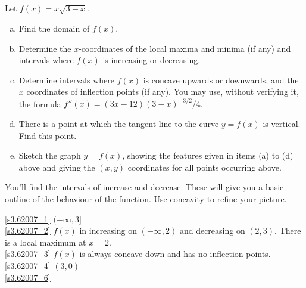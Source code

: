 %
%

\subsection*{\Procedural}

\begin{Mquestion}[2007H]
 Let $f(x) = x\sqrt{3 - x}$.
\begin{enumerate}[(a)]
\item\label{s3.62007_1} Find the domain of $f(x)$.
\item\label{s3.62007_2} Determine the $x$-coordinates of the local
maxima and minima (if any) and intervals where $f(x)$ is increasing or decreasing.
\item\label{s3.62007_3}  Determine intervals where $f(x)$ is concave
upwards or downwards, and the $x$ coordinates of inflection points (if any).
You may use, without verifying it, the formula $f''(x) = (3x -12)(3 - x)^{-3/2}/4$.
\item\label{s3.62007_4}  There is a point at which the tangent line to the
curve $y = f(x)$ is vertical. Find this point.
\item\label{s3.62007_6} Sketch the graph $y = f(x)$, showing
the features given in items (a) to (d) above and giving the $(x, y)$ coordinates
for all points occurring above.
\end{enumerate}
\end{Mquestion}
\begin{hint}
You'll find the intervals of increase and decrease. These will give you a basic outline of the behaviour of the function. Use  concavity to refine your picture.
\end{hint}
\begin{answer}
\eqref{s3.62007_1} $(-\infty,3]$
\\
\eqref{s3.62007_2} $f(x)$ in increasing on $(-\infty,2)$ and decreasing on $(2,3)$. There is a local maximum at $x=2$.
\\
\eqref{s3.62007_3} $f(x)$ is always concave down and has no inflection points.
\\
\eqref{s3.62007_4} $(3,0)$
\\
\eqref{s3.62007_6}
\begin{center}
\end{center}

\end{answer}
